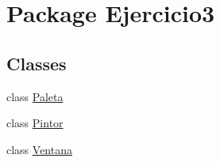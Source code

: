 \hypertarget{namespace_ejercicio3}{}\section{Package Ejercicio3}
\label{namespace_ejercicio3}
\subsection*{Classes}
\begin{DoxyCompactItemize}
\item 
class \mbox{\hyperlink{class_ejercicio3_1_1_paleta}{Paleta}}
\item 
class \mbox{\hyperlink{class_ejercicio3_1_1_pintor}{Pintor}}
\item 
class \mbox{\hyperlink{class_ejercicio3_1_1_ventana}{Ventana}}
\end{DoxyCompactItemize}
